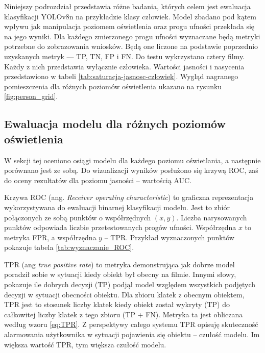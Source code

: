 Niniejszy podrozdział przedstawia różne badania, których celem jest ewaluacja klasyfikacji YOLOv8n na przykładzie klasy człowiek. Model zbadano pod kątem wpływu jak manipulacja poziomem oświetlenia oraz progu ufności przekłada się na jego wyniki. Dla każdego zmierzonego progu ufności wyznaczane będą metryki potrzebne do zobrazowania wniosków. Będą one liczone na podstawie poprzednio uzyskanych metryk --- TP, TN, FP i FN. Do testu wykrzystano cztery filmy. Każdy z nich przedstawia wyłącznie człowieka. Wartości jasności i nasycenia przedstawiono w tabeli \ref{tab:saturacja-jasnosc-czlowiek}. Wygląd nagranego pomieszczenia dla różnych poziomów oświetlenia ukazano na rysunku \ref{fig:person_grid}. 









\subsection{Ewaluacja modelu dla różnych poziomów oświetlenia}
\label{sec:test-AUC}
W sekcji tej oceniono osiągi modelu dla każdego poziomu oświetlania, a następnie porównano jest ze sobą. Do wizualizacji wyników posłużono się krzywą ROC, zaś do oceny rezultatów dla poziomu jasności -- wartością AUC.

Krzywa ROC (ang. \emph{Receiver operating characteristic}) to graficzna reprezentacja wykorzystywana do ewaluacji binarnej klasyfikacji modelu. Jest to zbiór połączonych ze sobą punktów o współrzędnych $(x, y)$. Liczba narysowanych punktów odpowiada liczbie przetestowanych progów ufności. Współrzędna $x$ to metryka FPR, a współrzędna $y$ -- TPR. Przykład wyznaczonych punktów pokazuje tabela \ref{tab:wyznaczanie_ROC}. 


TPR (ang \emph{true positive rate}) to metryka demonstrująca jak dobrze model poradził sobie w sytuacji kiedy obiekt był obecny na filmie. Innymi słowy, pokazuje ile dobrych decyzji (TP) podjął model względem wszystkich podjętych decyzji w sytuacji obecności obiektu. Dla zbioru klatek z obecnym obiektem, TPR jest to stosunek liczby klatek kiedy obiekt został wykryty (TP) do całkowitej liczby klatek z tego zbioru (TP + FN). Metryka ta jest obliczana według wzoru \ref{eq:TPR}. Z perspektywy całego systemu TPR opisuję skuteczność alarmowania użytkownika w sytuacji pojawienia się obiektu -- czułość modelu. Im większa wartość TPR, tym większa czułość modelu.

